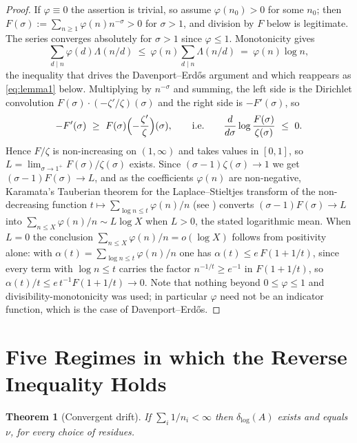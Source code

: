 \documentclass[11pt]{article}
\theoremstyle{plain}
\newtheorem{theorem}{Theorem}[section]
\theoremstyle{definition}
\newcommand{\dlog}{\delta_{\log}}
\begin{document}
\begin{proof}
If $\varphi\equiv0$ the assertion is trivial, so assume
$\varphi(n_0)>0$ for some $n_0$; then
$F(\sigma):=\sum_{n\ge1}\varphi(n)n^{-\sigma}>0$ for
$\sigma>1$, and division by $F$ below is legitimate.  The series
converges absolutely for $\sigma>1$ since $\varphi\le1$.
Monotonicity gives
\[
  \sum_{d\mid n}\varphi(d)\Lambda(n/d)
  \ \le\ \varphi(n)\sum_{d\mid n}\Lambda(n/d)
  \ =\ \varphi(n)\log n,
\]
the inequality that drives the Davenport--Erd\H{o}s argument and
which reappears as \eqref{eq:lemma1} below.
Multiplying by $n^{-\sigma}$ and summing, the left side is the
Dirichlet convolution $F(\sigma)\cdot(-\zeta'/\zeta)(\sigma)$
and the right side is $-F'(\sigma)$, so
\[
  -F'(\sigma)\ \ge\ F(\sigma)\Bigl(-\frac{\zeta'}{\zeta}\Bigr)
  (\sigma),
  \qquad\text{i.e.}\qquad
  \frac{d}{d\sigma}\log\frac{F(\sigma)}{\zeta(\sigma)}\ \le\ 0 .
\]
Hence $F/\zeta$ is non-increasing on $(1,\infty)$ and takes
values in $[0,1]$, so $L=\lim_{\sigma\to1^+}F(\sigma)/\zeta(\sigma)$
exists.  Since $(\sigma-1)\zeta(\sigma)\to1$ we get
$(\sigma-1)F(\sigma)\to L$, and as the coefficients $\varphi(n)$
are non-negative, Karamata's Tauberian theorem for the
Laplace--Stieltjes transform of the non-decreasing function
$t\mapsto\sum_{\log n\le t}\varphi(n)/n$ (see
\cite[Ch.~II.7]{Tenenbaum}) converts $(\sigma-1)F(\sigma)\to L$
into $\sum_{n\le X}\varphi(n)/n\sim L\log X$ when $L>0$, the
stated logarithmic mean.  When $L=0$ the conclusion
$\sum_{n\le X}\varphi(n)/n=o(\log X)$ follows from positivity
alone: with $\alpha(t)=\sum_{\log n\le t}\varphi(n)/n$ one has
$\alpha(t)\le e\,F(1+1/t)$, since every term with $\log n\le t$
carries the factor $n^{-1/t}\ge e^{-1}$ in $F(1+1/t)$, so
$\alpha(t)/t\le e\,t^{-1}F(1+1/t)\to0$.  Note that
nothing beyond $0\le\varphi\le1$ and divisibility-monotonicity
was used; in particular $\varphi$ need not be an indicator
function, which is the case of Davenport--Erd\H{o}s.
\end{proof}

\section{Five Regimes in which the Reverse Inequality Holds}\label{sec:regimes}

\begin{theorem}[Convergent drift]\label{thm:conv}
If $\sum_i 1/n_i<\infty$ then $\dlog(A)$ exists and equals
$\nu$, for every choice of residues.
\end{theorem}
\end{document}

